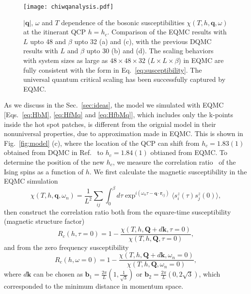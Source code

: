 \documentclass[aps,prx,twocolumn,superscriptaddress,showpacs,floatfix]{revtex4-1}
\renewcommand{\vec}[1]{\mathbf{#1}}
\begin{document}
\begin{figure*}[htp]
\centering
\texttt{[image: chiwqanalysis.pdf]}
\caption{$|\mathbf{q}|$, $\omega$ and $T$ dependence of the bosonic susceptibilities $\chi(T,h,\mathbf{q},\omega)$ at the itinerant QCP $h=h_c$. Comparison of the EQMC results with $L$ upto 48 and $\beta$ upto 32 (a) and (c), with the previous DQMC results with $L$ and $\beta$ upto 30 (b) and (d). The scaling behaviors with system sizes as large as $48\times48\times32$ ($L\times L\times \beta$) in EQMC are fully consistent with the form in Eq.~\ref{eq:susceptibility}. The universal quantum critical scaling has been successfully captured by EQMC.}
\label{fig:chi-qw-analysis}
\end{figure*}

As we discuss in the Sec.~\ref{sec:ideas}, the model we simulated with EQMC [Eqs.~\eqref{eq:HbM}, \eqref{eq:HfMq} and \eqref{eq:HfbMq}], which includes only the k-points inside the hot spot patches, is different from the orignial model in their nonuniversal properties, due to approximation made in EQMC. This is shown in Fig.~\ref{fig:model} (c), where the location of the QCP can shift from $h_c=1.83(1)$ obtained from DQMC in Ref.~ to $h_c=1.84(1)$ obtianed from EQMC. To determine the position of the new $h_c$, we measure the correlation ratio~\cite{Pujari2016,Xu2017} of the Ising spins as a function of $h$. We first calculate the magnetic susceptibility in the EQMC simulation
\begin{equation}
\chi(T,h,\mathbf{q},\omega_n)=\frac{1}{L^2}\sum_{ij}\int^{\beta}_{0}d\tau \exp^{i(\omega_n\tau -\mathbf{q}\cdot\mathbf{r}_{ij})}\langle s^{z}_{i}(\tau)s^{z}_{j}(0)\rangle,
\end{equation}
then construct the correlation ratio both from the equare-time susceptibility (magnetic structure factor)
\begin{equation}
\label{eq:Rctau0}
R_c(h,\tau=0)=1-\frac{\chi(T,h,\mathbf{Q}+d\vec{k},\tau=0)}{\chi(T,h,\mathbf{Q},\tau=0)},
\end{equation}
and from the zero frequency susceptibility
\begin{equation}
\label{eq:Rcomega0}
R_c(h,\omega=0)=1-\frac{\chi(T,h,\mathbf{Q}+d\vec{k},\omega_n=0)}{\chi(T,h,\mathbf{Q},\omega_n=0)},
\end{equation}
where $d\vec{k}$ can be chosen as $\vec{b}_1=\frac{2\pi}{L}(1,\frac{1}{\sqrt{3}})$ or $\vec{b}_2=\frac{2\pi}{L}(0,2\sqrt{3})$, which corresponded to the minimum distance in momentum space.
\end{document}
